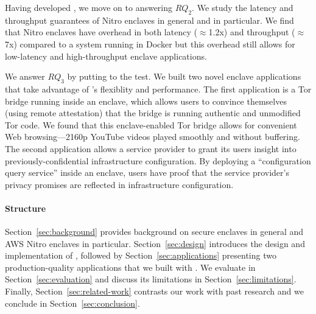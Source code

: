Having developed \tool{}, we move on to answering $RQ_2$.  We study the
latency and throughput guarantees of Nitro enclaves in general and \tool{} in
particular.  We find that Nitro enclaves have overhead in both latency
($\approx$1.2x) and throughput ($\approx$7x) compared to a system running in
Docker but this overhead still allows for low-latency and high-throughput
enclave applications.

We answer $RQ_3$ by putting \tool{} to the test.  We built two novel enclave
applications that take advantage of \tool{}'s flexiblity and performance.  The
first application is a Tor bridge running inside an enclave, which allows users
to convince themselves (using remote attestation) that the bridge is running
authentic and unmodified Tor code.  We found that this enclave-enabled Tor
bridge allows for convenient Web browsing---2160p YouTube videos played smoothly
and without buffering.  The second application allows a service provider to
grant its users insight into previously-confidential infrastructure
configuration.  By deploying a ``configuration query service'' inside an
enclave, users have proof that the service provider's privacy promises are
reflected in infrastructure configuration.

\paragraph{Structure}

Section~\ref{sec:background} provides background on secure enclaves in general
and AWS Nitro enclaves in particular.  Section~\ref{sec:design} introduces the
design and implementation of \tool{}, followed by
Section~\ref{sec:applications} presenting two production-quality applications
that we built with \tool{}.  We evaluate \tool{} in
Section~\ref{sec:evaluation} and discuss its limitations in
Section~\ref{sec:limitations}.  Finally, Section~\ref{sec:related-work}
contrasts our work with past research and we conclude in
Section~\ref{sec:conclusion}.
